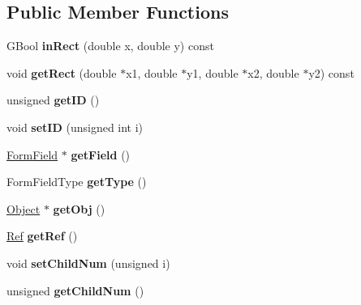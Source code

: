 \subsection*{Public Member Functions}
\begin{DoxyCompactItemize}
\item 
\mbox{\label{class_form_widget_a1c428ee16b4be6c157829b2cc2c39e3b}} 
G\+Bool {\bfseries in\+Rect} (double x, double y) const
\item 
\mbox{\label{class_form_widget_a8e4864692431e4c9dc9a8d045b82c4c5}} 
void {\bfseries get\+Rect} (double $\ast$x1, double $\ast$y1, double $\ast$x2, double $\ast$y2) const
\item 
\mbox{\label{class_form_widget_a46804cc5848460109d33cdacceedf359}} 
unsigned {\bfseries get\+ID} ()
\item 
\mbox{\label{class_form_widget_a595e5d41a32851c485f1e146ee28ba60}} 
void {\bfseries set\+ID} (unsigned int i)
\item 
\mbox{\label{class_form_widget_a25b22b4b66c3746a436032fbd99abf2e}} 
\hyperlink{class_form_field}{Form\+Field} $\ast$ {\bfseries get\+Field} ()
\item 
\mbox{\label{class_form_widget_a7dd2b5e14bd9b04e4327aa406c7ce567}} 
Form\+Field\+Type {\bfseries get\+Type} ()
\item 
\mbox{\label{class_form_widget_a6971a33aaaae473a9313266095abe4c1}} 
\hyperlink{class_object}{Object} $\ast$ {\bfseries get\+Obj} ()
\item 
\mbox{\label{class_form_widget_aabbefade769d22b1d4c7e5f141f2f1bb}} 
\hyperlink{struct_ref}{Ref} {\bfseries get\+Ref} ()
\item 
\mbox{\label{class_form_widget_a322dee2148591c6c623b5b2141801fc4}} 
void {\bfseries set\+Child\+Num} (unsigned i)
\item 
\mbox{\label{class_form_widget_a945fd09efb4431bb4f3702e867bb5cf9}} 
unsigned {\bfseries get\+Child\+Num} ()

\end{DoxyCompactItemize}
